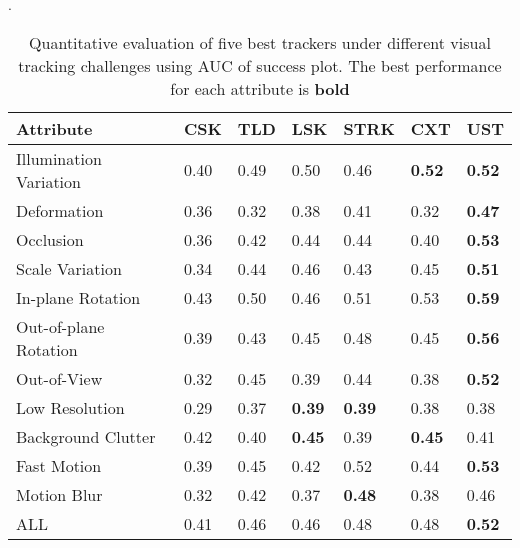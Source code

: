 \documentclass[conference,twoside]{IEEEtran}
\begin{document}
\begin{table}[t]
\caption{Quantitative evaluation of five best trackers under different visual tracking challenges using AUC of success plot. The best performance for each attribute is \textbf{bold}}.
\label{tab:attributes}
\centering
\renewcommand{\arraystretch}{1.1}
\begin{tabularx}{\linewidth}{@{}l|X X X X X X@{}}
Attribute 					& CSK  & TLD  & LSK  & STRK & CXT  & UST \\ \hline
Illumination Variation     	& 0.40 & 0.49 & 0.50 & 0.46 & \textbf{0.52} & \textbf{0.52} \\
Deformation    				& 0.36 & 0.32 & 0.38 & 0.41 & 0.32 & \textbf{0.47} \\
Occlusion    				& 0.36 & 0.42 & 0.44 & 0.44 & 0.40 & \textbf{0.53} \\
Scale Variation    			& 0.34 & 0.44 & 0.46 & 0.43 & 0.45 & \textbf{0.51} \\
In-plane Rotation    		& 0.43 & 0.50 & 0.46 & 0.51 & 0.53 & \textbf{0.59} \\
Out-of-plane Rotation    	& 0.39 & 0.43 & 0.45 & 0.48 & 0.45 & \textbf{0.56} \\
Out-of-View     			& 0.32 & 0.45 & 0.39 & 0.44 & 0.38 & \textbf{0.52} \\
Low Resolution     			& 0.29 & 0.37 & \textbf{0.39} & \textbf{0.39} & 0.38 & 0.38 \\
Background Clutter     		& 0.42 & 0.40 & \textbf{0.45} & 0.39 & \textbf{0.45} & 0.41 \\
Fast Motion     			& 0.39 & 0.45 & 0.42 & 0.52 & 0.44 & \textbf{0.53} \\
Motion Blur     			& 0.32 & 0.42 & 0.37 & \textbf{0.48} & 0.38 & 0.46 \\
\hline
ALL    						& 0.41 & 0.46 & 0.46 & 0.48 & 0.48 & \textbf{0.52} \\
\end{tabularx}
\end{table}
\end{document}

